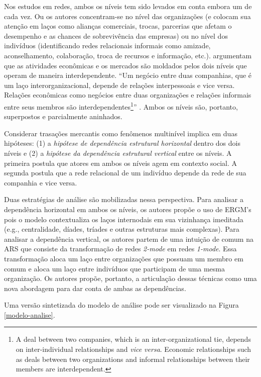 \documentclass[a4paper, 12pt, openright, oneside, german, french, english, brazil]{abntex2}
\begin{document}
	Nos estudos em redes, ambos os níveis tem sido levados em conta embora um de cada vez. Ou os autores concentram-se no nível das organizações (e colocam sua atenção em laços como alianças comerciais, trocas, parcerias que afetam o desempenho e as chances de sobrevivência das empresas) ou no nível dos indivíduos (identificando redes relacionais informais como amizade, aconselhamento, colaboração, troca de recursos e informação, etc.).  argumentam que as atividades econômicas e os mercados são moldados pelos dois níveis que operam de maneira interdependente. ``Um negócio entre duas companhias, que é um laço interorganizacional, depende de relações interpessoais e vice versa. Relações econômicas como negócios entre duas organizações e relações informais entre seus membros são interdependentes\footnote{A deal between two companies, which is an inter-organizational tie, depends on inter-individual relationships and \textit{vice versa}. Economic relationships such as deals between two organizations and informal relationships between their members are interdependent.}'' \cite[p. 246]{brailly2016market}. Ambos os níveis são, portanto, superpostos e parcialmente aninhados.

	Considerar trasações mercantis como fenômenos multinível implica em duas hipóteses: (1) a \textit{hipótese de dependência estrutural horizontal} dentro dos dois níveis e (2) a \textit{hipótese da dependência estrutural vertical} entre os níveis. A primeira postula que atores em ambos os níveis agem em contexto social. A segunda postula que a rede relacional de um indivíduo depende da rede de sua companhia e vice versa.

	Duas estratégias de análise são mobilizadas nessa perspectiva. Para analisar a dependência horizontal em ambos os níveis, os autores propõe o uso de ERGM's pois o modelo contextualiza os laços internodais em sua vizinhança imeditada (e.g., centralidade, díades, tríades e outras estruturas mais complexas). Para analisar a dependência vertical, os autores partem de uma intuição de comum na ARS que consiste da transformação de redes \textit{2-mode} em redes \textit{1-mode}. Essa transformação aloca um laço entre organizações que possuam um membro em comum e aloca um laço entre indivíduos que participam de uma mesma organização. Os autores propõe, portanto, a articulação dessas técnicas como uma nova abordagem para dar conta de ambas as dependências.


	Uma versão sintetizada do modelo de análise pode ser visualizado na Figura \ref{modelo-analise}.
\end{document}
